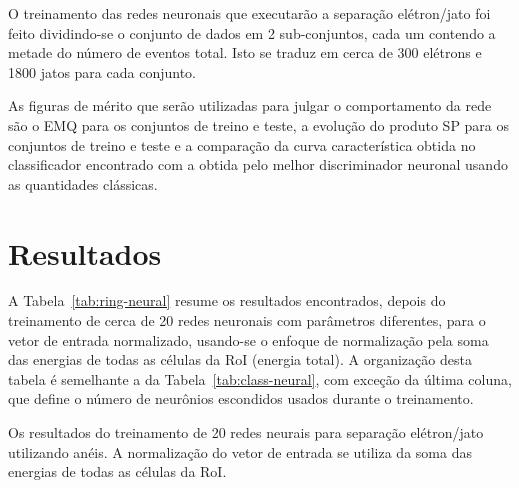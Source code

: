 O treinamento das redes neuronais que executarão a separação elétron/jato foi
feito dividindo-se o conjunto de dados em 2 sub-conjuntos, cada um contendo a
metade do número de eventos total. Isto se traduz em cerca de 300 elétrons e
1800 jatos para cada conjunto.

As figuras de mérito que serão utilizadas para julgar o comportamento da rede
são o EMQ para os conjuntos de treino e teste, a evolução do produto SP para os
conjuntos de treino e teste e a comparação da curva característica obtida no
classificador encontrado com a obtida pelo melhor discriminador neuronal usando
as quantidades clássicas.

\section{Resultados}

A Tabela~\ref{tab:ring-neural} resume os resultados encontrados, depois do
treinamento de cerca de 20 redes neuronais com parâmetros diferentes, para o
vetor de entrada normalizado, usando-se o enfoque de normalização pela soma
das energias de todas as células da RoI (energia total). A organização desta
tabela é semelhante a da Tabela~\ref{tab:class-neural}, com exceção da última
coluna, que define o número de neurônios escondidos usados durante o
treinamento.

\renewcommand{\baselinestretch}{1}
\begin{table}
\caption[Os resultados do treinamento de 20 redes neurais para separação
elétron/jato utilizando anéis.]{Os resultados do treinamento de 20 redes
neurais para separação elétron/jato utilizando anéis. A normalização do vetor
de entrada se utiliza da soma das energias de todas as células da RoI.}
\label{tab:ring-neural}
\renewcommand{\baselinestretch}{1.4}
\small
\begin{center}
\begin{sideways}

\end{sideways}
\end{center}
\end{table}
\renewcommand{\baselinestretch}{1.5}
\normalsize

